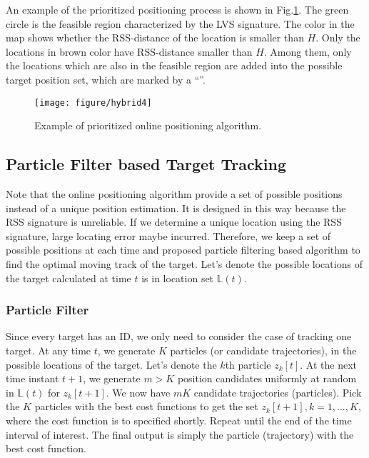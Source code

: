 \documentclass[conference, 10pt]{IEEEtran}
\begin{document}
An example of the prioritized positioning process is shown in Fig.\ref{fig4}. The green circle is the feasible region characterized by the LVS signature. The color in the map shows whether the RSS-distance of the location is smaller than $H$. Only the locations in brown color have RSS-distance smaller than $H$. Among them, only the locations which are also in the feasible region are added into the possible target position set, which are marked by a ``\checkmark''.

 
\begin{figure}[htbp]
\begin{center}
\texttt{[image: figure/hybrid4]}
\caption{Example of prioritized online positioning algorithm.}
\label{fig4}
\end{center}
\end{figure}

\subsection{Particle Filter based Target Tracking}
Note that the online positioning algorithm provide a set of possible positions instead of a unique position estimation. It is designed in this way because the RSS signature is unreliable. If we determine a unique location using the RSS signature, large locating error maybe incurred. Therefore, we keep a set of possible positions at each time and proposed particle filtering based algorithm to find the optimal moving track of the target.  Let's denote the possible locations of the target calculated at time $t$ is in location set $\mathbb{L}(t)$. 
\subsubsection{Particle Filter}
Since every target has an ID, we only need to consider the case of tracking one target. At any time $t$, we generate $K$ particles (or candidate trajectories), in the possible locations of the target. Let's denote the $k$th particle $z_{k}[t]$. At the next time instant $t+1$, we generate $m>K$ position candidates uniformly at random in $\mathbb{L}(t)$ for $z_k[t+1]$. We now have $mK$ candidate trajectories (particles). Pick the $K$ particles with the best cost functions to get the set ${z_{k}[t+1], k = 1, …,K}$, where the cost function is to specified shortly. Repeat until the end of the time interval of interest. The final output
is simply the particle (trajectory) with the best cost function.
\end{document}
